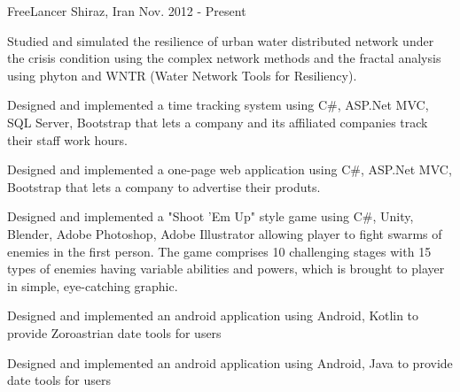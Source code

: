 


\begin{cventries}


\cventry
{} %
{FreeLancer} %
{Shiraz, Iran} %
{Nov. 2012 - Present} %
{ %
\begin{cvitems}
\item {Studied and simulated the resilience of urban water distributed network under the crisis condition using the complex network methods and the fractal analysis using phyton and WNTR (Water Network Tools for Resiliency).}
\item {Designed and implemented a time tracking system using C\#, ASP.Net MVC, SQL Server, Bootstrap that lets a company and its affiliated companies track their staff work hours.}
\item {Designed and implemented a one-page web application using C\#, ASP.Net MVC, Bootstrap that lets a company to advertise their produts.}
\item {Designed and implemented a "Shoot 'Em Up" style game using C\#, Unity, Blender, Adobe Photoshop, Adobe Illustrator allowing player to fight swarms of enemies in the first person. The game comprises 10 challenging stages with 15 types of enemies having variable abilities and powers, which is brought to player in simple, eye-catching graphic.}
\item {Designed and implemented an android application using Android, Kotlin to provide Zoroastrian date tools for users}
\item {Designed and implemented an android application using Android, Java to provide date tools for users}
\end{cvitems}
}


\end{cventries}